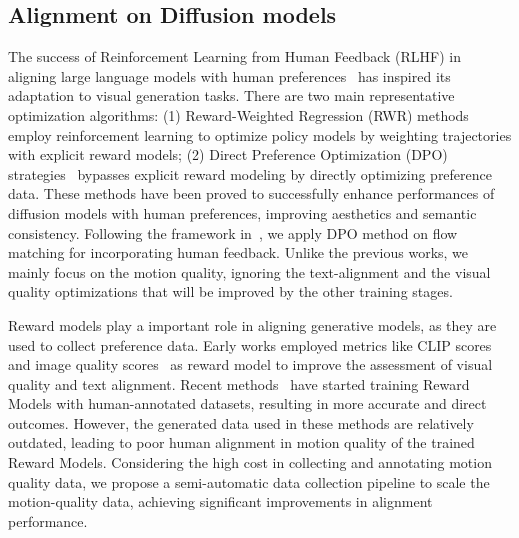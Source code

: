 \documentclass{article}
\begin{document}
\subsection{Alignment on Diffusion models}
The success of Reinforcement Learning from Human Feedback (RLHF) in aligning large language models with human preferences~\cite{ouyang2022traininglanguagemodelsfollow} has inspired its adaptation to visual generation tasks. 
There are two main representative optimization algorithms: (1) Reward-Weighted Regression (RWR) methods~\cite{2021Advantage,0Aligning} employ reinforcement learning to optimize policy models by weighting trajectories with explicit reward models; (2) Direct Preference Optimization (DPO) strategies~\cite{2023Diffusion,2023Using,2024Step,liu2024videodpoomnipreferencealignmentvideo,ma2025stepvideot2vtechnicalreportpractice,liu2025improving} bypasses explicit reward modeling by directly optimizing preference data. These methods have been proved to successfully
enhance performances of diffusion models with human preferences, improving aesthetics and semantic consistency. 
Following the framework in~\cite{liu2025improving}, we apply DPO method on flow matching for incorporating human feedback. Unlike the previous works, we mainly focus on the motion quality, ignoring the text-alignment and the visual quality optimizations that will be improved by the other training stages.

Reward models play a important role in aligning generative models, as they are used to collect preference data. Early works employed metrics like CLIP scores~\cite{radford2021learning} and image quality scores~\cite{2021MUSIQ} as reward model to improve the assessment of visual quality and text alignment. Recent methods~\cite{liu2025improving,wang2025unifiedrewardmodelmultimodal,tong2025mjvideofinegrainedbenchmarkingrewarding} have started training Reward Models with human-annotated datasets, resulting in more accurate and direct outcomes. However, the generated data used in these methods are relatively outdated, leading to poor human alignment in motion quality of the trained Reward Models. Considering the high cost in collecting and annotating motion quality data, we propose a semi-automatic data collection pipeline to scale the motion-quality data, achieving significant improvements in alignment performance.
\end{document}
